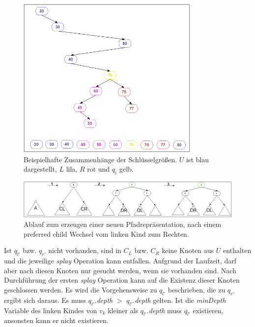 \documentclass[a4paper,12pt]{article}
\begin{document}
\begin{figure}[h]
	\centering
	\includegraphics[width= 0.8\textwidth]{"Medien/Multisplay/keySpace"}
	\caption {Beispielhafte Zusammenhänge der Schlüsselgrößen. $U$ ist blau dargestellt, $L$ lila, $R$ rot und $q_i$ gelb. }
	\label{fig:keySpace}
\end{figure} 
\begin{figure}[h]
	\centering
	\includegraphics[width= 1\textwidth]{"Medien/Multisplay/split"}
	\caption {Ablauf zum erzeugen einer neuen Pfadrepräsentation, nach einem preferred child Wechsel vom linken Kind zum Rechten.}
	\label{fig:split}
\end{figure} 
\noindent Ist $q_{l'}$ bzw. $q_{r'}$ nicht vorhanden, sind in $C_L$ bzw. $C_R$ keine Knoten aus $U$ enthalten und die jeweilige \textit{splay} Operation kann entfallen. Aufgrund der Laufzeit, darf aber nach diesen Knoten nur gesucht werden, wenn sie vorhanden sind. Nach Durchführung der ersten \textit{splay} Operation  kann auf die Existenz dieser Knoten geschlossen werden. Es wird die Vorgehensweise zu  $q_{l'}$ beschrieben, die zu  $q_{r'}$ ergibt sich daraus. Es muss $q_{l'}.$\textit{depth} $>$ $q_{l'}.$\textit{depth} gelten. Ist die \textit{minDepth} Variable des linken Kindes von $v_k$ kleiner als $q_{l'}.$\textit{depth} muss $q_{l'}$ existieren, ansonsten kann er nicht existieren. 
\end{document}
